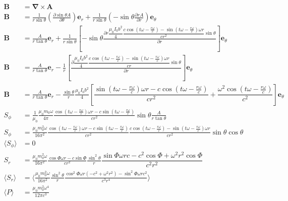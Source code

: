     \begin{align*}
    \boldsymbol{B}&=\boldsymbol{\nabla}\times\boldsymbol{A}\\
    \boldsymbol{B}&=\frac{1}{r\sin\theta}\left(\frac{\partial\sin\theta  A}{\partial \theta}\right)\boldsymbol{e}_r
    +\frac{1}{r\sin\theta }\left(
    -\sin\theta\frac{\partial r A}{\partial r}
    \right)\boldsymbol{e}_\theta\\
    \boldsymbol{B}&=\frac{A}{r\tan\theta}\boldsymbol{e}_r
    +\frac{1}{r\sin\theta }\left[
    -\sin\theta\frac{\partial r \dfrac{\mu_0I_0b^2}{4}\dfrac{
    c\cos\left(t\omega-\frac{r\omega}{c}\right)-\sin\left(t\omega-\frac{r\omega}{c}\right)\omega r}{cr^2}\sin\theta}{\partial r}
    \right]\boldsymbol{e}_\theta\\
    \boldsymbol{B}&=\frac{A}{r\tan\theta}\boldsymbol{e}_r
    -\frac{1}{r}\left[
    \frac{\partial \dfrac{\mu_0I_0b^2}{4}\dfrac{
    c\cos\left(t\omega-\frac{r\omega}{c}\right)-\sin\left(t\omega-\frac{r\omega}{c}\right)\omega r}{cr}\sin\theta}{\partial r}
    \right]\boldsymbol{e}_\theta\\
    \boldsymbol{B}&=\frac{A}{r\tan\theta}\boldsymbol{e}_r
    -\frac{\sin\theta}{r}\frac{\mu_0I_0b^2}{4}\left[
    \dfrac{\sin\left(t\omega-\frac{r\omega}{c}\right)\omega r-c\cos\left(t\omega-\frac{r\omega}{c}\right)}{cr^2}
    +\dfrac{\omega^2\cos\left(t\omega-\frac{r\omega}{c}\right)}{c^2}
    \right]\boldsymbol{e}_\theta\\
    S_\phi&=\frac{1}{\mu_0}\frac{\mu_0m_0\omega}{4\pi}\frac{
    \cos\left(t\omega-\frac{r\omega}{c}\right)\omega r-c\sin\left(t\omega-\frac{r\omega}{c}\right)}{cr^2}\sin\theta\frac{A}{r\tan\theta}\\
    S_\phi&=\frac{\mu_0m_0^2\omega}{16\pi^2}\frac{
    \cos\left(t\omega-\frac{r\omega}{c}\right)\omega r-c\sin\left(t\omega-\frac{r\omega}{c}\right)}{cr^2}\frac{
    c\cos\left(t\omega-\frac{r\omega}{c}\right)-\sin\left(t\omega-\frac{r\omega}{c}\right)\omega r}{cr^2}\sin\theta\cos\theta\\
    \langle S_\phi\rangle&=0\\
    S_r&=\frac{\mu_0m_0^2\omega}{16\pi^2}\frac{
    \cos\Phi\omega r-c\sin\Phi}{cr^2}\frac{\sin^2\theta}{r}
    \dfrac{\sin\Phi\omega rc-c^2\cos\Phi
    +\omega^2r^2\cos\Phi}{c^2r^2}\\
    \langle S_r\rangle&=\langle\frac{\mu_0m_0^2\omega}{16\pi^2}\frac{\sin^2\theta}{r}
    \frac{\cos^2\Phi\omega r(-c^2
    +\omega^2r^2)
    -\sin^2\Phi\omega rc^2}
    {c^3r^4}\rangle\\
    \langle P\rangle&=\frac{\mu_0m_0^2\omega^4}{12\pi c^3}
\end{align*}
